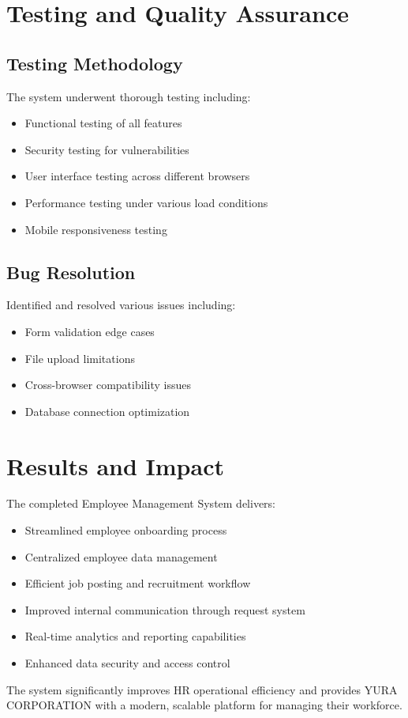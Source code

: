 \section{Testing and Quality Assurance}

\subsection{Testing Methodology}
The system underwent thorough testing including:
\begin{itemize}
    \item Functional testing of all features
    \item Security testing for vulnerabilities
    \item User interface testing across different browsers
    \item Performance testing under various load conditions
    \item Mobile responsiveness testing
\end{itemize}

\subsection{Bug Resolution}
Identified and resolved various issues including:
\begin{itemize}
    \item Form validation edge cases
    \item File upload limitations
    \item Cross-browser compatibility issues
    \item Database connection optimization
\end{itemize}

\section{Results and Impact}

The completed Employee Management System delivers:

\begin{itemize}
    \item Streamlined employee onboarding process
    \item Centralized employee data management
    \item Efficient job posting and recruitment workflow
    \item Improved internal communication through request system
    \item Real-time analytics and reporting capabilities
    \item Enhanced data security and access control
\end{itemize}

The system significantly improves HR operational efficiency and provides YURA CORPORATION with a modern, scalable platform for managing their workforce.
